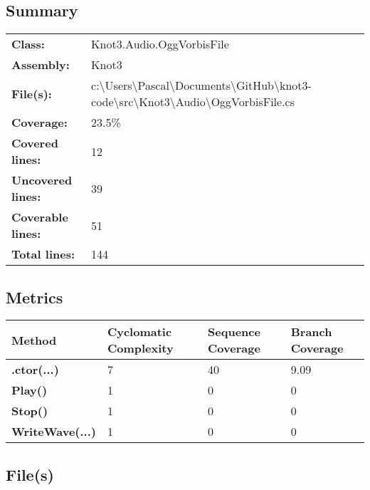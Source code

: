 \documentclass[a4paper,10pt]{article}
\begin{document}
\subsection{Summary}
\begin{longtable}[l]{ll}
\textbf{Class:} & Knot3.Audio.OggVorbisFile\\
\textbf{Assembly:} & Knot3\\
\textbf{File(s):} & \begin{minipage}[t]{12cm}{c:\textbackslash Users\textbackslash Pascal\textbackslash Documents\textbackslash GitHub\textbackslash knot3-code\textbackslash src\textbackslash Knot3\textbackslash Audio\textbackslash OggVorbisFile.cs}\end{minipage} \\
\textbf{Coverage:} & 23.5\%\\
\textbf{Covered lines:} & 12\\
\textbf{Uncovered lines:} & 39\\
\textbf{Coverable lines:} & 51\\
\textbf{Total lines:} & 144\\
\end{longtable}
\subsection{Metrics}
\begin{longtable}[l]{|l|l|l|l|}
\hline
\textbf{Method} & \textbf{Cyclomatic Complexity} & \textbf{Sequence Coverage} & \textbf{Branch Coverage}\\
\hline
\textbf{.ctor(...)} & 7 & 40 & 9.09\\
\hline
\textbf{Play()} & 1 & 0 & 0\\
\hline
\textbf{Stop()} & 1 & 0 & 0\\
\hline
\textbf{WriteWave(...)} & 1 & 0 & 0\\
\hline
\end{longtable}
\subsection{File(s)}
\end{document}
